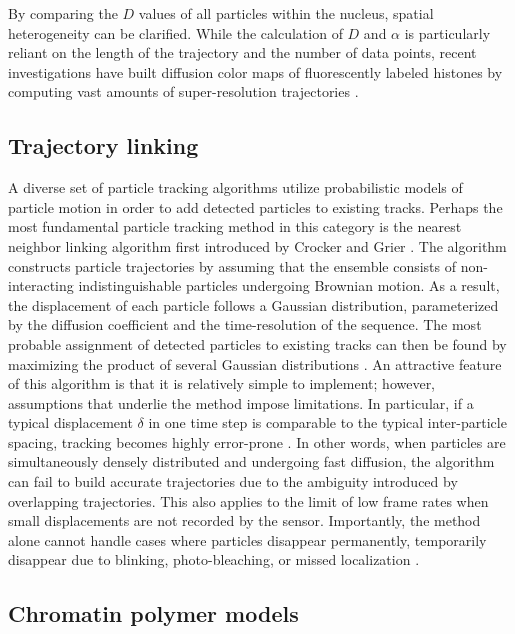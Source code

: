 By comparing the $D$ values of all particles within the nucleus, spatial heterogeneity can be clarified. While the calculation of $D$ and $\alpha$ is particularly reliant on the length of the trajectory and the number of data points, recent investigations have built diffusion color maps of fluorescently labeled histones by computing vast amounts of super-resolution trajectories \parencite{Amitai2017,Barth2020,Nozaki2017}.

\subsection{Trajectory linking}

A diverse set of particle tracking algorithms utilize probabilistic models of particle motion in order to add detected particles to existing tracks. Perhaps the most fundamental particle tracking method in this category is the nearest neighbor linking algorithm first introduced by Crocker and Grier \parencite{Crocker1996}. The algorithm constructs particle trajectories by assuming that the ensemble consists of non-interacting indistinguishable particles undergoing Brownian motion. As a result, the displacement of each particle follows a Gaussian distribution, parameterized by the diffusion coefficient and the time-resolution of the sequence. The most probable assignment of detected particles to existing tracks can then be found by maximizing the product of several Gaussian distributions \parencite{Crocker1996}. An attractive feature of this algorithm is that it is relatively simple to implement; however, assumptions that underlie the method impose limitations. In particular, if a typical displacement $\delta$ in one time step is comparable to the typical inter-particle spacing, tracking becomes highly error-prone \parencite{Crocker1996}. In other words, when particles are simultaneously densely distributed and undergoing fast diffusion, the algorithm can fail to build accurate trajectories due to the ambiguity introduced by overlapping trajectories. This also applies to the limit of low frame rates when small displacements are not recorded by the sensor. Importantly, the method alone cannot handle cases where particles disappear permanently, temporarily disappear due to blinking, photo-bleaching, or missed localization \parencite{Sbalzarini2005}.

\subsection{Chromatin polymer models}

